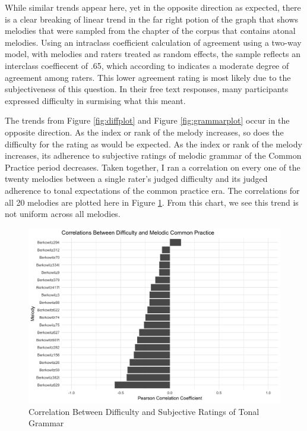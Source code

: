 \documentclass[12pt,]{book}
\begin{document}
While similar trends appear here, yet in the opposite direction as expected, there is a clear breaking of linear trend in the far right potion of the graph that shows melodies that were sampled from the chapter of the corpus that contains atonal melodies.
Using an intraclass coefficient calculation of agreement using a two-way model, with melodies and raters treated as random effects, the sample reflects an interclass coeffiecent of .65, which according to \citet{kooGuidelineSelectingReporting2016} indicates a moderate degree of agreement among raters.
This lower agreement rating is most likely due to the subjectiveness of this question.
In their free text responses, many participants expressed difficulty in surmising what this meant.

The trends from Figure \ref{fig:diffplot} and Figure \ref{fig:grammarplot} occur in the opposite direction.
As the index or rank of the melody increases, so does the difficulty for the rating as would be expected.
As the index or rank of the melody increases, its adherence to subjective ratings of melodic grammar of the Common Practice period decreases.
Taken together, I ran a correlation on every one of the twenty melodies between a single rater's judged difficulty and its judged adherence to tonal expectations of the common practice era.
The correlations for all 20 melodies are plotted here in Figure \ref{fig:gramcor}.
From this chart, we see this trend is not uniform across all melodies.

\begin{figure}

{\centering \includegraphics[width=1\linewidth]{img/grammar_difficulty_correlation_plot} 

}

\caption{Correlation Between Difficulty and Subjective Ratings of Tonal Grammar}\label{fig:gramcor}
\end{figure}
\end{document}
